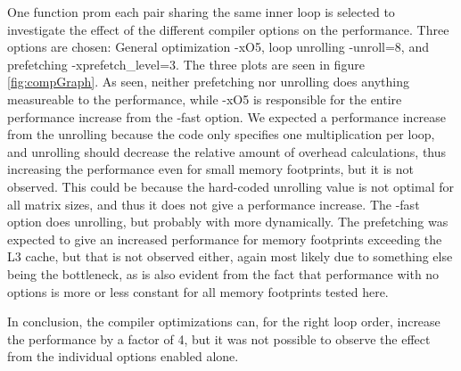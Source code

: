 One function prom each pair sharing the same inner loop is selected to investigate the effect of the different compiler options on the performance. Three options are chosen: General optimization -xO5, loop unrolling -unroll=8, and prefetching -xprefetch\_level=3. The three plots are seen in figure \ref{fig:compGraph}. As seen, neither prefetching nor unrolling does anything measureable to the performance, while -xO5 is responsible for the entire performance increase from the -fast option. We expected a performance increase from the unrolling because the code only specifies one multiplication per loop, and unrolling should decrease the relative amount of overhead calculations, thus increasing the performance even for small memory footprints, but it is not observed. This could be because the hard-coded unrolling value is not optimal for all matrix sizes, and thus it does not give a performance increase. The -fast option does unrolling, but probably with more dynamically. The prefetching was expected to give an increased performance for memory footprints exceeding the L3 cache, but that is not observed either, again most likely due to something else being the bottleneck, as is also evident from the fact that performance with no options is more or less constant for all memory footprints tested here.

In conclusion, the compiler optimizations can, for the right loop order, increase the performance by a factor of 4, but it was not possible to observe the effect from the individual options enabled alone.

